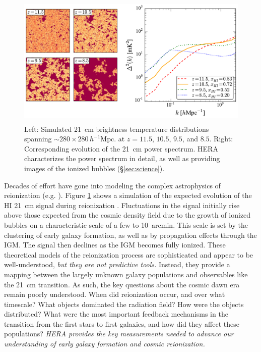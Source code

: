 \documentclass[preprint]{aastex}
\begin{document}
\begin{figure}[t]\centering
\includegraphics[height=2.5in]{plots/cubes/cubesAndPspecs.pdf}
\caption{\small 
Left: Simulated 21~cm brightness temperature distributions spanning $\sim 280 \times 280\,h^{-1}\textrm{Mpc}$.
at $z=11.5$, $10.5$, $9.5$, and $8.5$.
Right: Corresponding evolution of the 21~cm power spectrum.  HERA
characterizes the power spectrum in detail, as well as
providing images of the ionized bubbles (\S\ref{sec:science}).
}\label{fig:EoRsims} \end{figure}

Decades of effort have gone into modeling the complex astrophysics of reionization
(e.g. \citealt{shapiro_giroux1987, haiman_loeb1997, furlanetto_et_al2004, santos_et_al2010}). Figure \ref{fig:EoRsims} shows a 
simulation of the expected evolution of the HI 21~cm signal during reionization \citep{mesinger_furlanetto2007}. Fluctuations in the signal initially 
rise above those expected from the cosmic density field due to the growth of ionized bubbles on a characteristic 
scale of a few to 10~arcmin. This scale is set by the clustering of early galaxy formation, as well as by 
propagation effects through the IGM. The signal then declines as the IGM becomes fully ionized.  These theoretical 
models of the reionization process are sophisticated and appear to be well-understood, {\it but they are not 
predictive tools.} Instead, they provide a mapping between the largely unknown galaxy populations and observables 
like the 21~cm transition. As such, the key questions about the cosmic dawn era remain poorly understood.  When 
did reionization occur, and over what timescale?  What objects dominated the radiation field?  How were the 
objects distributed?  What were the most important feedback mechanisms in the transition from the first stars to
first galaxies, and how did they affect these populations?  {\it HERA provides the key measurements needed 
to advance our understanding of early galaxy formation and cosmic reionization.}
\end{document}
